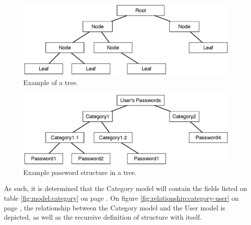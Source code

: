 			\begin{figure}[h!]
				\centering
				\includegraphics[width=\textwidth]{figures/design/general/generic-tree.eps}
				\caption{Example of a tree.}
				\label{fig:example:tree}
			\end{figure}
		
			\begin{figure}[p]
				\centering
				\includegraphics[width=\textwidth]{figures/design/general/password-tree.eps}
				\caption{Example password structure in a tree.}
				\label{fig:example:passwordtree}
			\end{figure}

			As such, it is determined that the Category model will contain the fields listed on table \ref{fig:model:category} on page \pageref{fig:model:category}. On figure \ref{fig:relationship:category-user} on page \pageref{fig:relationship:category-user}, the relationship between the Category model and the User model is depicted, as well as the recursive definition of structure with itself.


